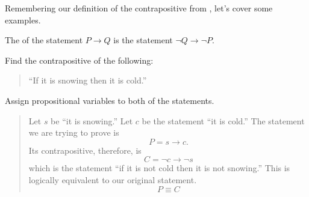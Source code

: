 Remembering our definition of the contrapositive from ,
let's cover some examples.

\begin{defn}
  The  of the statement $P \to Q$
  is the statement $\neg Q \to \neg P$.
  \label{defn:contrapositive}
\end{defn}

\begin{ex}
  Find the contrapositive of the following:
  \begin{quote}
    ``If it is snowing then it is cold.''
  \end{quote}
  \begin{sol}
    Assign propositional variables to both of the statements.
    \begin{quote}
      Let $s$ be ``it is snowing.'' Let $c$ be the statement ``it is cold.''
      The statement we are trying to prove is
      \[ P = s\to c.\]
      Its contrapositive, therefore, is
      \[ C = \neg c \to \neg s \]
      which is the statement ``if it is not cold then it is not snowing.''
      This is logically equivalent to our original statement.
      \[ P \equiv C \]
    \end{quote}
  \end{sol}
\end{ex}
